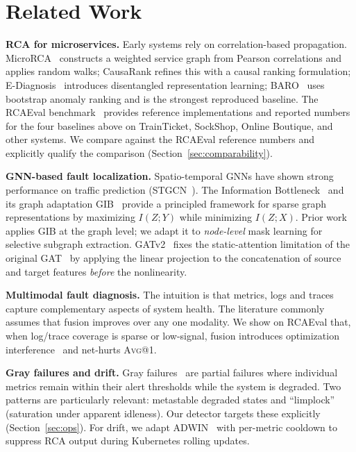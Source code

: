 \documentclass[11pt,a4paper]{article}
\makeatletter
\newcommand{\Avg}[1]{\textsc{Avg}@{#1}}
\makeatother
\begin{document}
\section{Related Work}
\label{sec:related}

\textbf{RCA for microservices.} Early systems rely on correlation-based
propagation. MicroRCA~\cite{wu2020microrca} constructs a weighted service
graph from Pearson correlations and applies random walks; CausaRank refines
this with a causal ranking formulation; E-Diagnosis~\cite{shan2019ediagnosis}
introduces disentangled representation learning; BARO~\cite{pham2024baro} uses
bootstrap anomaly ranking and is the strongest reproduced baseline. The
RCAEval benchmark~\cite{pham2024rcaeval} provides reference implementations
and reported numbers for the four baselines above on TrainTicket, SockShop,
Online Boutique, and other systems. We compare against the RCAEval reference
numbers and explicitly qualify the comparison
(Section~\ref{sec:comparability}).

\textbf{GNN-based fault localization.} Spatio-temporal GNNs have shown strong
performance on traffic prediction (STGCN~\cite{yu2018stgcn}). The Information
Bottleneck~\cite{tishby2015ib} and its graph adaptation
GIB~\cite{wu2020gib} provide a principled framework for sparse graph
representations by maximizing $I(Z;Y)$ while minimizing $I(Z;X)$. Prior work
applies GIB at the graph level; we adapt it to \emph{node-level} mask
learning for selective subgraph extraction.
GATv2~\cite{brody2022gatv2} fixes the static-attention limitation of the
original GAT~\cite{velickovic2018gat} by applying the linear projection to the
concatenation of source and target features \emph{before} the nonlinearity.

\textbf{Multimodal fault diagnosis.} The intuition is that metrics, logs and
traces capture complementary aspects of system health. The literature
commonly assumes that fusion improves over any one modality. We show on
RCAEval that, when log/trace coverage is sparse or low-signal, fusion
introduces optimization interference~\cite{yu2020gradsurg} and net-hurts
\Avg{1}.

\textbf{Gray failures and drift.} Gray failures~\cite{huang2017gray} are
partial failures where individual metrics remain within their alert
thresholds while the system is degraded. Two patterns are particularly
relevant: metastable degraded states and ``limplock'' (saturation under
apparent idleness). Our detector targets these explicitly
(Section~\ref{sec:ops}). For drift, we adapt
ADWIN~\cite{bifet2007adwin} with per-metric cooldown to suppress RCA output
during Kubernetes rolling updates.
\end{document}
